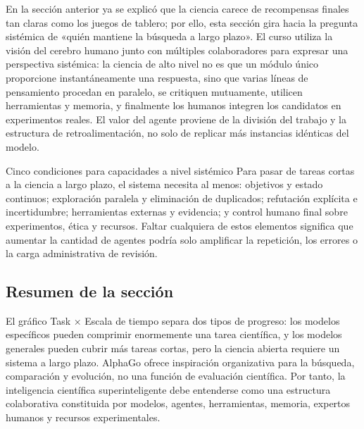 En la sección anterior ya se explicó que la ciencia carece de recompensas finales tan claras como los juegos de tablero; por ello, esta sección gira hacia la pregunta sistémica de «quién mantiene la búsqueda a largo plazo». El curso utiliza la visión del cerebro humano junto con múltiples colaboradores para expresar una perspectiva sistémica: la ciencia de alto nivel no es que un módulo único proporcione instantáneamente una respuesta, sino que varias líneas de pensamiento procedan en paralelo, se critiquen mutuamente, utilicen herramientas y memoria, y finalmente los humanos integren los candidatos en experimentos reales. El valor del agente proviene de la división del trabajo y la estructura de retroalimentación, no solo de replicar más instancias idénticas del modelo.


\begin{importantbox}{Cinco condiciones para capacidades a nivel sistémico}
Para pasar de tareas cortas a la ciencia a largo plazo, el sistema necesita al menos: objetivos y estado continuos; exploración paralela y eliminación de duplicados; refutación explícita e incertidumbre; herramientas externas y evidencia; y control humano final sobre experimentos, ética y recursos. Faltar cualquiera de estos elementos significa que aumentar la cantidad de agentes podría solo amplificar la repetición, los errores o la carga administrativa de revisión.
\end{importantbox}


\subsection{Resumen de la sección}

El gráfico Task × Escala de tiempo separa dos tipos de progreso: los modelos específicos pueden comprimir enormemente una tarea científica, y los modelos generales pueden cubrir más tareas cortas, pero la ciencia abierta requiere un sistema a largo plazo. AlphaGo ofrece inspiración organizativa para la búsqueda, comparación y evolución, no una función de evaluación científica. Por tanto, la inteligencia científica superinteligente debe entenderse como una estructura colaborativa constituida por modelos, agentes, herramientas, memoria, expertos humanos y recursos experimentales.
